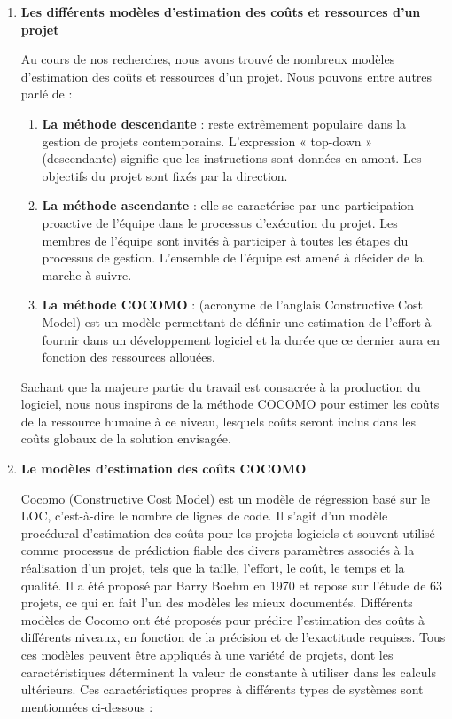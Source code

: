 \begin{enumerate}
	\item \textbf{Les différents modèles d'estimation des coûts et ressources d’un projet}

	      Au cours de nos recherches, nous avons trouvé de nombreux modèles d’estimation des coûts et ressources d’un projet. Nous pouvons entre autres parlé de :

	      \begin{enumerate}
		      \item \textbf{La méthode descendante} : reste extrêmement populaire dans la gestion de projets contemporains. L'expression « top-down » (descendante) signifie que les instructions sont données en amont. Les objectifs du projet sont fixés par la direction.
		      \item \textbf{La méthode ascendante} : elle se caractérise par une participation proactive de l'équipe dans le processus d'exécution du projet. Les membres de l'équipe sont invités à participer à toutes les étapes du processus de gestion. L'ensemble de l'équipe est amené à décider de la marche à suivre.
		      \item \textbf{La méthode COCOMO} : (acronyme de l'anglais Constructive Cost Model) est un modèle permettant de définir une estimation de l'effort à fournir dans un développement logiciel et la durée que ce dernier aura en fonction des ressources allouées.
	      \end{enumerate}

	      Sachant que la majeure partie du travail est consacrée à la production du logiciel, nous nous inspirons de la méthode COCOMO pour estimer les coûts de la ressource humaine à ce niveau, lesquels coûts seront inclus dans les coûts globaux de la solution envisagée.

	\item \textbf{Le modèles d'estimation des coûts COCOMO}

	      Cocomo (Constructive Cost Model) est un modèle de régression basé sur le LOC, c’est-à-dire le nombre de lignes de code. Il s’agit d’un modèle procédural d’estimation des coûts pour les projets logiciels et souvent utilisé comme processus de prédiction fiable des divers paramètres associés à la réalisation d’un projet, tels que la taille, l’effort, le coût, le temps et la qualité. Il a été proposé par Barry Boehm en 1970 et repose sur l’étude de 63 projets, ce qui en fait l’un des modèles les mieux documentés. Différents modèles de Cocomo ont été proposés pour prédire l’estimation des coûts à différents niveaux, en fonction de la précision et de l’exactitude requises. Tous ces modèles peuvent être appliqués à une variété de projets, dont les caractéristiques déterminent la valeur de constante à utiliser dans les calculs ultérieurs. Ces caractéristiques propres à différents types de systèmes sont mentionnées ci-dessous :


\end{enumerate}
